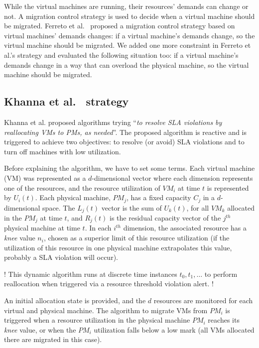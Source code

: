 While the virtual machines are running, their resources' demands can change or not. A migration control strategy is used to decide when a virtual machine should be migrated.
Ferreto et al.~\cite{ferreto2011server} proposed a migration control strategy based on virtual machines' demands changes: if a virtual machine's demands change, so the virtual machine should be migrated.
We added one more constraint in Ferreto et al.'s strategy and evaluated the following situation too: if a virtual machine's demands change in a way that can overload the physical machine, so the virtual machine should be migrated.


\subsection{Khanna et al.~\cite{khanna2006application} strategy}

Khanna et al. proposed algorithms trying ``\emph{to resolve SLA violations by reallocating VMs to PMs, as needed}''.
The proposed algorithm is reactive and is triggered to achieve two objectives: to resolve (or avoid) SLA violations and to turn off machines with low utilization.

Before explaining the algorithm, we have to set some terms.
Each virtual machine (VM) was represented as a $d$-dimensional vector where each dimension represents one of the resources, and the resource utilization of $VM_i$ at time $t$ is represented by $U_i(t)$.
Each physical machine, $PM_j$, has a fixed capacity $C_j$ in a $d$-dimensional space. The $L_j(t)$ vector is the sum of $U_k(t)$, for all $VM_k$ allocated in the $PM_j$ at time $t$, and $R_j(t)$ is the residual capacity vector of the $j^{th}$ physical machine at time $t$. 
In each $i^{th}$ dimension, the associated resource has a \emph{knee} value $n_i$, chosen as a superior limit of this resource utilization (if the utilization of this resource in one physical machine extrapolates this value, probably a SLA violation will occur).

! This dynamic algorithm runs at discrete time instances $t_0, t_1, \ldots$  to perform reallocation when triggered via a resource threshold violation alert. !

An initial allocation state is provided, and the $d$ resources are monitored for each virtual and physical machine. The algorithm to migrate VMs from $PM_i$ is triggered when a resource utilization in the physical machine $PM_i$ reaches its \emph{knee} value, or when the $PM_i$ utilization falls below a low mark (all VMs allocated there are migrated in this case).

